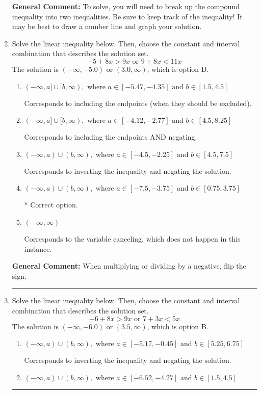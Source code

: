 \documentclass{extbook}[14pt]
\newcommand{\litem}[1]{\item #1

\rule{\textwidth}{0.4pt}}
\begin{document}
\begin{enumerate}
{\textbf{General Comment:} To solve, you will need to break up the compound inequality into two inequalities. Be sure to keep track of the inequality! It may be best to draw a number line and graph your solution.
}
\litem{
Solve the linear inequality below. Then, choose the constant and interval combination that describes the solution set.
\[ -5 + 8 x > 9 x \text{ or } 9 + 8 x < 11 x \]The solution is \( (-\infty, -5.0) \text{ or } (3.0, \infty) \), which is option D.\begin{enumerate}[label=\Alph*.]
\item \( (-\infty, a] \cup [b, \infty), \text{ where } a \in [-5.47, -4.35] \text{ and } b \in [1.5, 4.5] \)

Corresponds to including the endpoints (when they should be excluded).
\item \( (-\infty, a] \cup [b, \infty), \text{ where } a \in [-4.12, -2.77] \text{ and } b \in [4.5, 8.25] \)

Corresponds to including the endpoints AND negating.
\item \( (-\infty, a) \cup (b, \infty), \text{ where } a \in [-4.5, -2.25] \text{ and } b \in [4.5, 7.5] \)

Corresponds to inverting the inequality and negating the solution.
\item \( (-\infty, a) \cup (b, \infty), \text{ where } a \in [-7.5, -3.75] \text{ and } b \in [0.75, 3.75] \)

 * Correct option.
\item \( (-\infty, \infty) \)

Corresponds to the variable canceling, which does not happen in this instance.
\end{enumerate}

\textbf{General Comment:} When multiplying or dividing by a negative, flip the sign.
}
\litem{
Solve the linear inequality below. Then, choose the constant and interval combination that describes the solution set.
\[ -6 + 8 x > 9 x \text{ or } 7 + 3 x < 5 x \]The solution is \( (-\infty, -6.0) \text{ or } (3.5, \infty) \), which is option B.\begin{enumerate}[label=\Alph*.]
\item \( (-\infty, a) \cup (b, \infty), \text{ where } a \in [-5.17, -0.45] \text{ and } b \in [5.25, 6.75] \)

Corresponds to inverting the inequality and negating the solution.
\item \( (-\infty, a) \cup (b, \infty), \text{ where } a \in [-6.52, -4.27] \text{ and } b \in [1.5, 4.5] \)


\end{enumerate}}
\end{enumerate}
\end{document}
